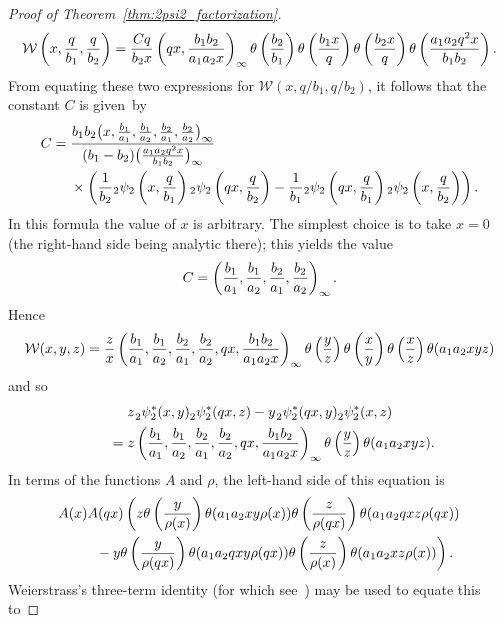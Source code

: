 \documentclass[10pt,a4paper]{amsart}
\numberwithin{equation}{section}
\renewcommand{\sp}{\hspace{0.5pt}}
\begin{document}
\begin{proof}[Proof of Theorem~\ref{thm:2psi2_factorization}]
\[ \mathcal{W}\left(x,{q \over b_1},{q \over b_2}\right) = {Cq \over b_2x} \left(qx,{b_1b_2 \over a_1a_2x}\right)_{ \infty} \theta\left({b_2 \over b_1} \right) \theta\left( {b_1x \over q} \right) \theta\left( {b_2x \over q} \right) \theta\left({a_1a_2q^2x \over b_1b_2}\right). \]
From equating these two expressions for $\mathcal{W}(x,q/b_1,q/b_2)$, it follows that the constant $C$ is given~by
\begin{align*}
 C = {}&{b_1b_2 \bigl(x,{b_1 \over a_1},{b_1 \over a_2},{b_2 \over a_1},{b_2 \over a_2}\bigr)_\infty \over (b_1-b_2) \bigl({a_1a_2q^2x \over b_1b_2}\bigr)_\infty}\\
 &\times\left( {1 \over b_2} {}_2\psi_2\left(x,{q \over b_1}\right) {}_2\psi_2\left(qx,{q \over b_2}\right) - {1 \over b_1} {}_2\psi_2\left(qx,{q \over b_1}\right){}_2\psi_2\left(x,{q \over b_2}\right) \right).
 \end{align*}
In this formula the value of $x$ is arbitrary. The simplest choice is to take $x=0$ (the right-hand side being analytic there); this yields the value
\[ C = \left({b_1 \over a_1},{b_1 \over a_2},{b_2 \over a_1},{b_2 \over a_2}\right)_{ \infty}. \]
Hence
\[ \mathcal{W}(x,y,z) = {z \over x} \left({b_1 \over a_1},{b_1 \over a_2},{b_2 \over a_1},{b_2 \over a_2},qx,{b_1b_2 \over a_1a_2x}\right)_{ \infty} \theta\left({y \over z} \right) \theta\left( {x \over y} \right) \theta\left( {x \over z} \right) \theta(a_1a_2xyz) \]
and so
\begin{gather}
z \sp {}_2^{}\psi_2^\ast(x,y) {}_2^{}\psi_2^\ast(qx,z) - y \sp {}_2^{}\psi_2^\ast(qx,y){}_2^{}\psi_2^\ast(x,z)\nonumber\\
\qquad = z \left({b_1 \over a_1},{b_1 \over a_2},{b_2 \over a_1},{b_2 \over a_2},qx,{b_1b_2 \over a_1a_2x}\right)_{ \infty} \theta\left({y \over z} \right) \theta(a_1a_2xyz). \label{eqn:2psi2_Wronskian_factorization}
\end{gather}
In terms of the functions $A$ and $\rho$, the left-hand side of this equation is
\begin{gather*}
A(x) A(qx) \left( z \theta\left({y \over \rho(x)}\right) \theta (a_1a_2xy\rho(x) ) \theta\left({z \over \rho(qx)}\right) \theta (a_1a_2qxz\rho(qx) )\right. \\
\left.\qquad{}- y \theta\left({y \over \rho(qx)}\right) \theta (a_1a_2qxy\rho(qx) ) \theta\left({z \over \rho(x)}\right) \theta (a_1a_2xz\rho(x) ) \right).
\end{gather*}
Weierstrass's three-term identity (for which see~\cite[Exercise~2.16\,(i)]{Gasper2004}) may be used to equate this to

\end{proof}
\end{document}
